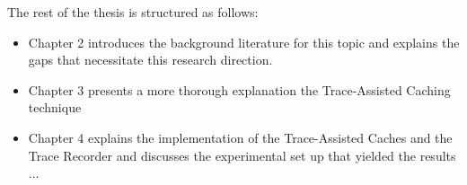 The rest of the thesis is structured as follows:
\begin{itemize}
	\item Chapter 2 introduces the background literature for this topic and explains the gaps that necessitate this research direction.
	\item Chapter 3 presents a more thorough explanation the Trace-Assisted Caching technique 
	\item Chapter 4 explains the implementation of the Trace-Assisted Caches and the Trace Recorder and discusses the experimental set up that yielded the results
	...
\end{itemize}